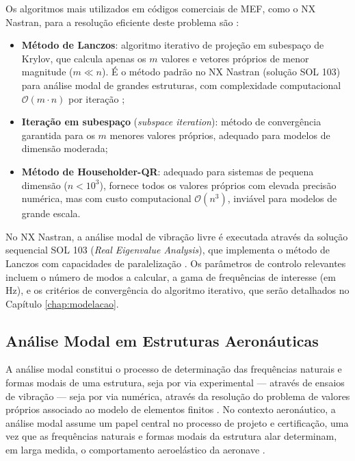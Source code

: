 \documentclass[a4paper,fleqn]{cas-sc}
\begin{document}
Os algoritmos mais utilizados em códigos comerciais de MEF, como o NX Nastran, para a resolução eficiente deste problema são \cite{Bathe2014}:

\begin{itemize}
    \item \textbf{Método de Lanczos}: algoritmo iterativo de projeção em subespaço de Krylov, que calcula apenas os $m$ valores e vetores próprios de menor magnitude ($m \ll n$). É o método padrão no NX Nastran (solução SOL 103) para análise modal de grandes estruturas, com complexidade computacional $\mathcal{O}(m \cdot n)$ por iteração \cite{Nastran2014};

    \item \textbf{Iteração em subespaço} (\textit{subspace iteration}): método de convergência garantida para os $m$ menores valores próprios, adequado para modelos de dimensão moderada;

    \item \textbf{Método de Householder-QR}: adequado para sistemas de pequena dimensão ($n < 10^3$), fornece todos os valores próprios com elevada precisão numérica, mas com custo computacional $\mathcal{O}(n^3)$, inviável para modelos de grande escala.
\end{itemize}

No NX Nastran, a análise modal de vibração livre é executada através da solução sequencial SOL 103 (\textit{Real Eigenvalue Analysis}), que implementa o método de Lanczos com capacidades de paralelização \cite{Nastran2014}. Os parâmetros de controlo relevantes incluem o número de modos a calcular, a gama de frequências de interesse (em \si{\hertz}), e os critérios de convergência do algoritmo iterativo, que serão detalhados no Capítulo \ref{chap:modelacao}.

\subsection{Análise Modal em Estruturas Aeronáuticas}

A análise modal constitui o processo de determinação das frequências naturais e formas modais de uma estrutura, seja por via experimental --- através de ensaios de vibração --- seja por via numérica, através da resolução do problema de valores próprios associado ao modelo de elementos finitos \cite{Ewins2000, Maia1997}. No contexto aeronáutico, a análise modal assume um papel central no processo de projeto e certificação, uma vez que as frequências naturais e formas modais da estrutura alar determinam, em larga medida, o comportamento aeroelástico da aeronave \cite{Wright2015}.
\end{document}
